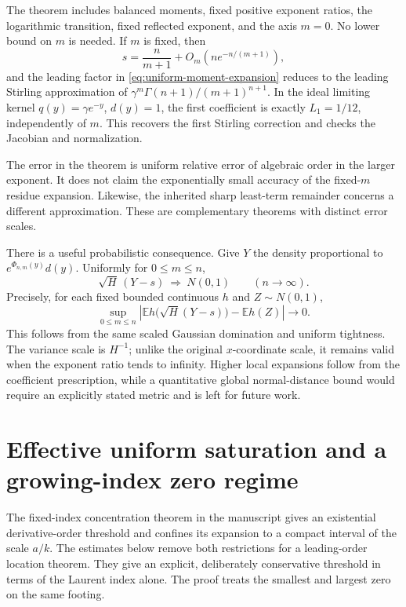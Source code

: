 \documentclass[11pt,letterpaper]{article}
\theoremstyle{definition}
\theoremstyle{remark}
\begin{document}
The theorem includes balanced moments, fixed positive exponent ratios,
the logarithmic transition, fixed reflected exponent, and the axis $m=0$.
No lower bound on $m$ is needed. If $m$ is fixed, then
\[
 s=\frac{n}{m+1}+O_m(ne^{-n/(m+1)}),
\]
and the leading factor in \eqref{eq:uniform-moment-expansion} reduces to
the leading Stirling approximation of
$\gamma^m\Gamma(n+1)/(m+1)^{n+1}$. In the ideal limiting kernel
$q(y)=\gamma e^{-y}$, $d(y)=1$, the first coefficient is exactly
$L_1=1/12$, independently of $m$. This recovers the first Stirling
correction and checks the Jacobian and normalization.

The error in the theorem is uniform relative error of algebraic order
in the larger exponent. It does not claim the exponentially small
accuracy of the fixed-$m$ residue expansion. Likewise, the inherited
sharp least-term remainder concerns a different approximation. These
are complementary theorems with distinct error scales.

There is a useful probabilistic consequence. Give $Y$ the density
proportional to $e^{\Phi_{n,m}(y)}d(y)$. Uniformly for $0\le m\le n$,
\[
 \sqrt H\,(Y-s)\ \Longrightarrow\ N(0,1)
 \qquad(n\to\infty).
\]
Precisely, for each fixed bounded continuous $h$ and $Z\sim N(0,1)$,
\[
 \sup_{0\le m\le n}
 \left|\mathbb E h\bigl(\sqrt H(Y-s)\bigr)-\mathbb E h(Z)\right|
 \longrightarrow0.
\]
This follows from the same scaled Gaussian domination and uniform
tightness. The variance scale is $H^{-1}$;
unlike the original $x$-coordinate scale, it remains valid when the
exponent ratio tends to infinity. Higher local expansions follow from
the coefficient prescription, while a quantitative global normal-distance
bound would require an explicitly stated metric and is left for future work.

\section{Effective uniform saturation and a growing-index zero regime}
\label{efflerch:sec:main}

The fixed-index concentration theorem in the manuscript gives an
existential derivative-order threshold and confines its expansion to a
compact interval of the scale $a/k$.  The estimates below remove both
restrictions for a leading-order location theorem.  They give an explicit,
deliberately conservative threshold in terms of the Laurent index alone.
The proof treats the smallest and largest zero on the same footing.
\end{document}
